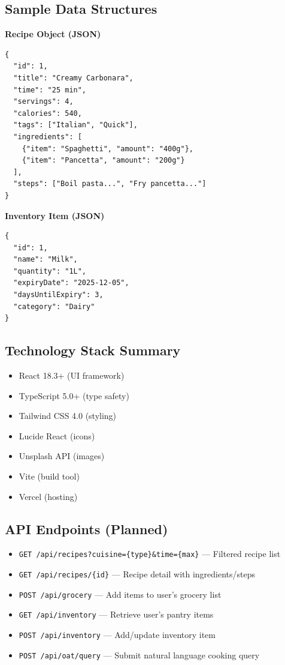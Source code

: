 \documentclass[12pt]{article}
\begin{document}
\subsection{Sample Data Structures}
\textbf{Recipe Object (JSON)}
\begin{verbatim}
{
  "id": 1,
  "title": "Creamy Carbonara",
  "time": "25 min",
  "servings": 4,
  "calories": 540,
  "tags": ["Italian", "Quick"],
  "ingredients": [
    {"item": "Spaghetti", "amount": "400g"},
    {"item": "Pancetta", "amount": "200g"}
  ],
  "steps": ["Boil pasta...", "Fry pancetta..."]
}
\end{verbatim}

\textbf{Inventory Item (JSON)}
\begin{verbatim}
{
  "id": 1,
  "name": "Milk",
  "quantity": "1L",
  "expiryDate": "2025-12-05",
  "daysUntilExpiry": 3,
  "category": "Dairy"
}
\end{verbatim}

\subsection{Technology Stack Summary}
\begin{itemize}
  \item React 18.3+ (UI framework)
  \item TypeScript 5.0+ (type safety)
  \item Tailwind CSS 4.0 (styling)
  \item Lucide React (icons)
  \item Unsplash API (images)
  \item Vite (build tool)
  \item Vercel (hosting)
\end{itemize}

\subsection{API Endpoints (Planned)}
\begin{itemize}
  \item \texttt{GET /api/recipes?cuisine=\{type\}\&time=\{max\}} — Filtered recipe list
  \item \texttt{GET /api/recipes/\{id\}} — Recipe detail with ingredients/steps
  \item \texttt{POST /api/grocery} — Add items to user's grocery list
  \item \texttt{GET /api/inventory} — Retrieve user's pantry items
  \item \texttt{POST /api/inventory} — Add/update inventory item
  \item \texttt{POST /api/oat/query} — Submit natural language cooking query
\end{itemize}
\end{document}
